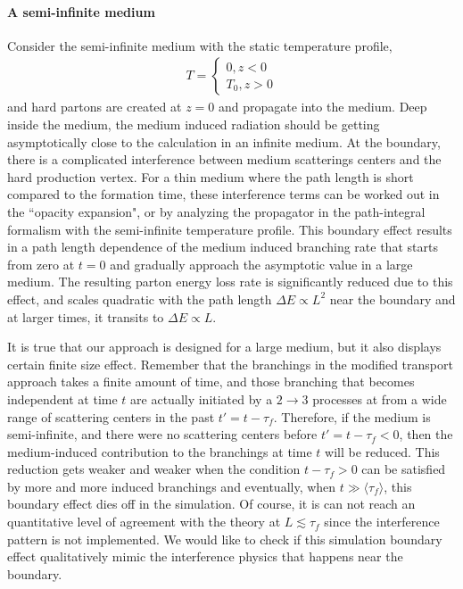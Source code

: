 \paragraph{A semi-infinite medium}
Consider the semi-infinite medium with the static temperature profile,
\begin{eqnarray}
T = \begin{cases}
0 , z<0\\
T_0, z>0
\end{cases}
\end{eqnarray}
and hard partons are created at $z=0$ and propagate into the medium.
Deep inside the medium, the medium induced radiation should be getting asymptotically close to the calculation in an infinite medium.
At the boundary, there is a complicated interference between medium scatterings centers and the hard production vertex.
For a thin medium where the path length is short compared to the formation time, these interference terms can be worked out in the ``opacity expansion", or by analyzing the propagator in the path-integral formalism with the semi-infinite temperature profile.
This boundary effect results in a path length dependence of the medium induced branching rate that starts from zero at $t=0$ and gradually approach the asymptotic value in a large medium.
The resulting parton energy loss rate is significantly reduced due to this effect, and scales quadratic with the path length $\Delta E \propto L^2$ near the boundary and at larger times, it transits to $\Delta E \propto L$.

It is true that our approach is designed for a large medium, but it also displays certain finite size effect. 
Remember that the branchings in the modified transport approach takes a finite amount of time, and those branching that becomes independent at time $t$ are actually initiated by a $2\rightarrow 3$ processes at from a wide range of scattering centers in the past $t' = t - \tau_f$.
Therefore, if the medium is semi-infinite, and there were no scattering centers before $t' = t-\tau_f < 0$, then the medium-induced contribution to the branchings at time $t$ will be reduced.
This reduction gets weaker and weaker when the condition $t-\tau_f > 0$ can be satisfied by more and more induced branchings and eventually, when $t\gg \langle \tau_f\rangle$, this boundary effect dies off in the simulation. 
Of course, it is can not reach an quantitative level of agreement with the theory at $L \lesssim \tau_f$ since the interference pattern is not implemented.
We would like to check if this simulation boundary effect qualitatively mimic the interference physics that happens near the boundary.


